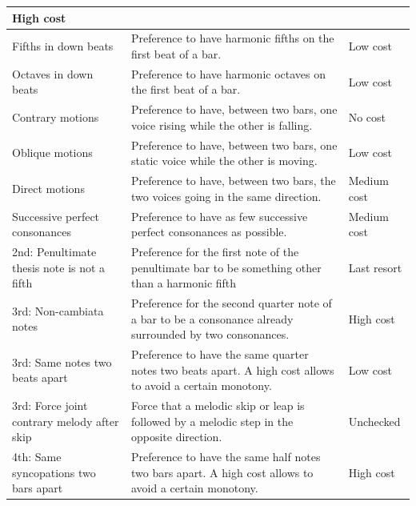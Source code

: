 \begin{table}[!h]
\begin{adjustbox}{center}
\begin{tabular}{|m{}|m{}|m{}<{\centering}|}
          High cost \\ \hline
        \cellcolor[HTML]{C8D6FF}Fifths in down beats &
          Preference to have harmonic fifths on the first beat of a bar. &
          Low cost \\ \hline
        \cellcolor[HTML]{C8D6FF}Octaves in down beats &
          Preference to have harmonic octaves on the first beat of a bar. &
          Low cost \\ \hline
        \cellcolor[HTML]{C8D6FF}Contrary motions &
          Preference to have, between two bars, one voice rising while the other is falling. &
          No cost \\ \hline
        \cellcolor[HTML]{C8D6FF}Oblique motions &
          Preference to have, between two bars, one static voice while the other is moving. &
          Low cost \\ \hline
        \cellcolor[HTML]{C8D6FF}Direct motions &
          Preference to have, between two bars, the two voices going in the same direction. &
          Medium cost \\ \hline
        \cellcolor[HTML]{C8D6FF}Successive perfect consonances &
          Preference to have as few successive perfect consonances as possible. &
          Medium cost \\ \hline
        \hline
        \cellcolor[HTML]{FFCE93}2nd: Penultimate thesis note is not a fifth &
          Preference for the first note of the penultimate bar to be something other than a harmonic fifth &
          Last resort \\ \hline
        \cellcolor[HTML]{FFCE93}3rd: Non-cambiata notes &
          Preference for the second quarter note of a bar to be a consonance already surrounded by two consonances. &
          High cost \\ \hline
        \cellcolor[HTML]{FFCE93}3rd: Same notes two beats apart &
          Preference to have the same quarter notes two beats apart. A high cost allows to avoid a certain monotony. &
          Low cost \\ \hline
        \cellcolor[HTML]{FFCE93}3rd: Force joint contrary melody after skip &
          Force that a melodic skip or leap is followed by a melodic step in the opposite direction. &
          Unchecked \\ \hline
        \cellcolor[HTML]{FFCE93}4th: Same syncopations two bars apart &
          Preference to have the same half notes two bars apart. A high cost allows to avoid a certain monotony. &
          High cost \\ \hline

\end{tabular}
\end{adjustbox}
\end{table}
